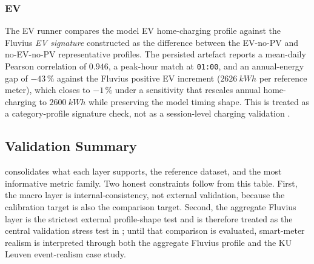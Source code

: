 \subsubsection*{EV}
The EV runner compares the model EV home-charging profile against the Fluvius \emph{EV signature} constructed as the difference between the EV-no-PV and no-EV-no-PV representative profiles. The persisted artefact reports a mean-daily Pearson correlation of $0.946$, a peak-hour match at \texttt{01:00}, and an annual-energy gap of $-43\,\%$ against the Fluvius positive EV increment ($\SI{2626}{kWh}$ per reference meter), which closes to $-1\,\%$ under a sensitivity that rescales annual home-charging to $\SI{2600}{kWh}$ while preserving the model timing shape. This is treated as a category-profile signature check, not as a session-level charging validation \cite{Fluvius2024OpenData}.



\subsection{Validation Summary}
\label{sec:validationSummary}

 consolidates what each layer supports, the reference dataset, and the most informative metric family. Two honest constraints follow from this table. First, the macro layer is internal-consistency, not external validation, because the calibration target is also the comparison target. Second, the aggregate Fluvius layer is the strictest external profile-shape test and is therefore treated as the central validation stress test in ; until that comparison is evaluated, smart-meter realism is interpreted through both the aggregate Fluvius profile and the KU\,Leuven event-realism case study.


